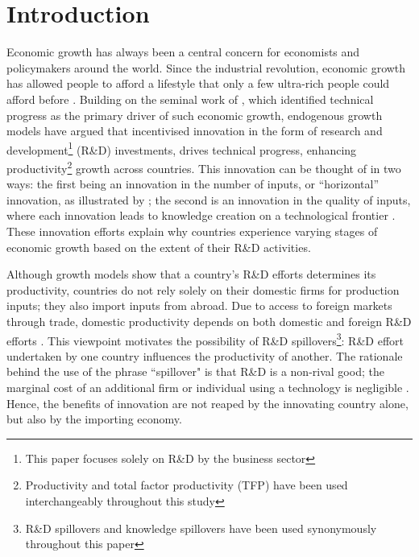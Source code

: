 \documentclass[12pt]{article}
\begin{document}
\newpage

\section{Introduction}

Economic growth has always been a central concern for economists and policymakers around the world. Since the industrial revolution, economic growth has allowed people to afford a lifestyle that only a few ultra-rich people could afford before \citep{Aghion1998}. Building on the seminal work of \citet{Solow1956}, which identified technical progress as the primary driver of such economic growth, endogenous growth models have argued that incentivised innovation in the form of research and development\footnote{This paper focuses solely on R\&D by the business sector} (R\&D) investments, drives technical progress, enhancing productivity\footnote{Productivity and total factor productivity (TFP) have been used interchangeably throughout this study} growth across countries. This innovation can be thought of in two ways: the first being an innovation in the number of inputs, or ``horizontal” innovation, as illustrated by \citet{Romer1990}; the second is an innovation in the quality of inputs, where each innovation leads to knowledge creation on a technological frontier \citep{Grossman1991ql, Aghion1992}. These innovation efforts explain why countries experience varying stages of economic growth based on the extent of their R\&D activities.

Although growth models show that a country's R\&D efforts determines its productivity, countries do not rely solely on their domestic firms for production inputs; they also import inputs from abroad. Due to access to foreign markets through trade, domestic productivity depends on both domestic and foreign R\&D efforts \citep{Grossman1991}. This viewpoint motivates the possibility of R\&D spillovers\footnote{R\&D spillovers and knowledge spillovers have been used synonymously throughout this paper}: R\&D effort undertaken by one country influences the productivity of another. The rationale behind the use of the phrase ``spillover" is that R\&D is a non-rival good; the marginal cost of an additional firm or individual using a technology is negligible \citep{Keller2004, Romer1990}. Hence, the benefits of innovation are not reaped by the innovating country alone, but also by the importing economy. 
	 
\end{document}
